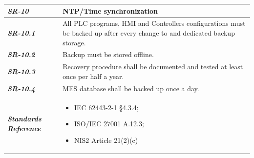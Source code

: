 \documentclass{article}
\begin{document}
\begin{tabularx}{\textwidth}{>{\bfseries}p{2.5cm} X}
    \textit{SR-10} & \textbf{NTP/Time synchronization} \vspace{0.5em}\\
\toprule
\textit{SR-10.1} &
    All PLC programs, HMI and Controllers configurations must be backed up after every change to and dedicated backup storage. 
    \vspace{0.5em}
\\
\textit{SR-10.2} &
    Backup must be stored offline.
    \vspace{0.5em}
\\
\textit{SR-10.3} &
    Recovery procedure shall be documented and tested at least once per half a year.
    \vspace{0.5em}
\\
\textit{SR-10.4} &
    MES database shall be backed up once a day.
    \vspace{0.5em}
\\
\midrule
    \textit{Standards Reference} &
\begin{itemize}[label=-, noitemsep, topsep=0pt, leftmargin=*]
    \item IEC 62443-2-1 §4.3.4; 
    \item ISO/IEC 27001 A.12.3; 
    \item NIS2 Article 21(2)(c)
\end{itemize} \vspace{1em} \\ 
\end{tabularx}
\vspace{2em}
\end{document}
